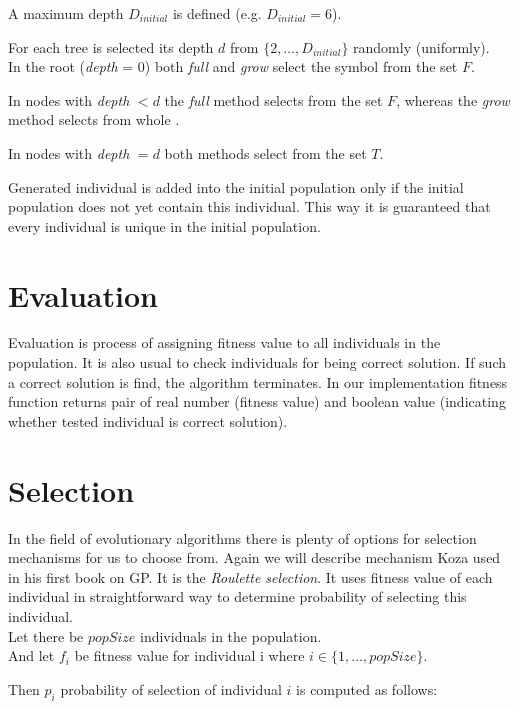 \documentclass[12pt,a4paper]{report}
\newcommand{\setDots}[2]{ 
	\lbrace #1 , \dots , #2 \rbrace
}
\begin{document}
A maximum depth $D_{initial}$ is defined (e.g. $D_{initial} = 6$).

For each tree is selected its 
depth $d$ from $\setDots{2}{D_{initial}}$ randomly (uniformly).\\


In the root (\textit{depth} = 0) both \textit{full} and \textit{grow}
select the symbol from the set $F$.

In nodes with \textit{depth} $< d$ the \textit{full}
method selects from the set $F$, whereas the \textit{grow} method 
selects from whole \TuF.

In nodes with \textit{depth} $= d$ both methods select from the
set $T$.

Generated individual is added into the initial population only if 
the initial population does not yet contain this individual.
This way it is guaranteed that every individual is unique 
in the initial population.
  
\section{Evaluation}

Evaluation is process of assigning fitness value to all 
individuals in the population. It is also usual to check
individuals for being correct solution.
If such a correct solution is find, the algorithm terminates. 
In our implementation fitness function returns
pair of real number (fitness value) and boolean value (indicating
whether tested individual is correct solution). 

 
\newpage

\section{Selection}

In the field of evolutionary algorithms there is plenty of 
options for selection mechanisms 
for us to choose from. Again we will describe mechanism Koza
used in his first book on GP. It is the \textit{Roulette selection}.
It uses fitness value of each individual in straightforward way to determine probability of selecting this individual.\\
Let there be $popSize$ individuals in the population.\\
And let $f_{i}$ be fitness value for individual i 
where $i \in \setDots{1}{popSize}$. 

Then $p_{i}$ probability of selection of individual $i$ is computed
as follows:
\end{document}
